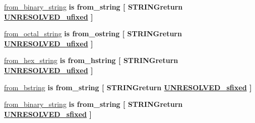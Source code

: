 \begin{DoxyCompactItemize}
\item 
\hyperlink{classfixed__pkg_a8e105c4593830f93742f43539e13c450}{from\+\_\+binary\+\_\+string}  {\bfseries {\bfseries \textcolor{keywordflow}{is}\textcolor{vhdlchar}{ }\textcolor{vhdlchar}{from\+\_\+string}\textcolor{vhdlchar}{ }\textcolor{vhdlchar}{\mbox{[}}\textcolor{vhdlchar}{ }\textcolor{vhdlchar}{S\+T\+R\+I\+N\+Greturn}\textcolor{vhdlchar}{ }{\bfseries \hyperlink{classfixed__pkg_ae78bc2b36d22f6abeac163955e8a587d}{U\+N\+R\+E\+S\+O\+L\+V\+E\+D\+\_\+ufixed}} \textcolor{vhdlchar}{ }\textcolor{vhdlchar}{\mbox{]}}\textcolor{vhdlchar}{ }}} {\bfseries \textcolor{vhdlchar}{ }} 
\item 
\hyperlink{classfixed__pkg_a2b0895c85462ecb81aa58edb01967ec6}{from\+\_\+octal\+\_\+string}  {\bfseries {\bfseries \textcolor{keywordflow}{is}\textcolor{vhdlchar}{ }\textcolor{vhdlchar}{from\+\_\+ostring}\textcolor{vhdlchar}{ }\textcolor{vhdlchar}{\mbox{[}}\textcolor{vhdlchar}{ }\textcolor{vhdlchar}{S\+T\+R\+I\+N\+Greturn}\textcolor{vhdlchar}{ }{\bfseries \hyperlink{classfixed__pkg_ae78bc2b36d22f6abeac163955e8a587d}{U\+N\+R\+E\+S\+O\+L\+V\+E\+D\+\_\+ufixed}} \textcolor{vhdlchar}{ }\textcolor{vhdlchar}{\mbox{]}}\textcolor{vhdlchar}{ }}} {\bfseries \textcolor{vhdlchar}{ }} 
\item 
\hyperlink{classfixed__pkg_a45012e8233db26718c3d252d329e30c6}{from\+\_\+hex\+\_\+string}  {\bfseries {\bfseries \textcolor{keywordflow}{is}\textcolor{vhdlchar}{ }\textcolor{vhdlchar}{from\+\_\+hstring}\textcolor{vhdlchar}{ }\textcolor{vhdlchar}{\mbox{[}}\textcolor{vhdlchar}{ }\textcolor{vhdlchar}{S\+T\+R\+I\+N\+Greturn}\textcolor{vhdlchar}{ }{\bfseries \hyperlink{classfixed__pkg_ae78bc2b36d22f6abeac163955e8a587d}{U\+N\+R\+E\+S\+O\+L\+V\+E\+D\+\_\+ufixed}} \textcolor{vhdlchar}{ }\textcolor{vhdlchar}{\mbox{]}}\textcolor{vhdlchar}{ }}} {\bfseries \textcolor{vhdlchar}{ }} 
\item 
\hyperlink{classfixed__pkg_a8565828ee8a865ed84907517f2e56ed5}{from\+\_\+bstring}  {\bfseries {\bfseries \textcolor{keywordflow}{is}\textcolor{vhdlchar}{ }\textcolor{vhdlchar}{from\+\_\+string}\textcolor{vhdlchar}{ }\textcolor{vhdlchar}{\mbox{[}}\textcolor{vhdlchar}{ }\textcolor{vhdlchar}{S\+T\+R\+I\+N\+Greturn}\textcolor{vhdlchar}{ }{\bfseries \hyperlink{classfixed__pkg_aa723b28a027c3c0f9bca02d75e8df4d6}{U\+N\+R\+E\+S\+O\+L\+V\+E\+D\+\_\+sfixed}} \textcolor{vhdlchar}{ }\textcolor{vhdlchar}{\mbox{]}}\textcolor{vhdlchar}{ }}} {\bfseries \textcolor{vhdlchar}{ }} 
\item 
\hyperlink{classfixed__pkg_a8a1b689470218e049c41d22ea4354e26}{from\+\_\+binary\+\_\+string}  {\bfseries {\bfseries \textcolor{keywordflow}{is}\textcolor{vhdlchar}{ }\textcolor{vhdlchar}{from\+\_\+string}\textcolor{vhdlchar}{ }\textcolor{vhdlchar}{\mbox{[}}\textcolor{vhdlchar}{ }\textcolor{vhdlchar}{S\+T\+R\+I\+N\+Greturn}\textcolor{vhdlchar}{ }{\bfseries \hyperlink{classfixed__pkg_aa723b28a027c3c0f9bca02d75e8df4d6}{U\+N\+R\+E\+S\+O\+L\+V\+E\+D\+\_\+sfixed}} \textcolor{vhdlchar}{ }\textcolor{vhdlchar}{\mbox{]}}\textcolor{vhdlchar}{ }}} {\bfseries \textcolor{vhdlchar}{ }} 

\end{DoxyCompactItemize}
